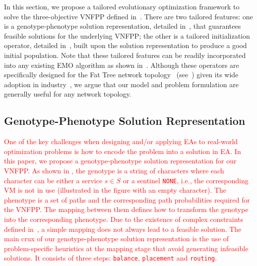 In this section, we propose a tailored evolutionary optimization framework to solve the three-objective VNFPP defined in~. There are two tailored features: one is a genotype-phenotype solution representation, detailed in~, that guarantees feasible solutions for the underlying VNFPP; the other is a tailored initialization operator, detailed in~, built upon the solution representation to produce a good initial population. Note that these tailored features can be readily incorporated into any existing EMO algorithm as shown in~. Although these operators are specifically designed for the Fat Tree network topology~\cite{AlFaresLV08} (see~) given its wide adoption in industry~\cite{LebiednikMT16}, we argue that our model and problem formulation are generally useful for any network topology.

\subsection{Genotype-Phenotype Solution Representation}
\label{sec:representation}
\textcolor{red}{One of the key challenges when designing and/or applying EAs to real-world optimization problems is how to encode the problem into a solution in EA. In this paper, we propose a genotype-phenotype solution representation for our VNFPP. As shown in , the genotype is a string of characters where each character can be either a service $s\in S$ or a sentinel \texttt{NONE}, i.e., the corresponding VM is not in use (illustrated in the figure with an empty character). The phenotype is a set of paths and the corresponding path probabilities required for the VNFPP. The mapping between them defines how to transform the genotype into the corresponding phenotype. Due to the existence of complex constraints defined in~, a simple mapping does not always lead to a feasible solution. The main crux of our genotype-phenotype solution representation is the use of problem-specific heuristics at the mapping stage that avoid generating infeasible solutions. It consists of three steps: \texttt{balance}, \texttt{placement} and \texttt{routing}.}

